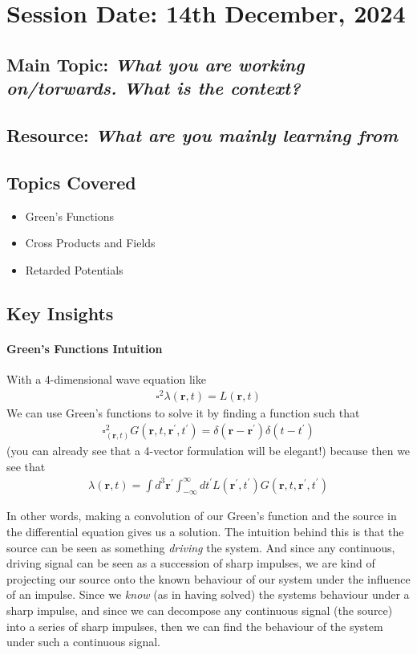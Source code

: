 \section{Session Date: 14th December, 2024}
\subsection*{Main Topic: \textit{What you are working on/torwards. What is the context?}}
\subsection*{Resource: \textit{What are you mainly learning from}}
\subsection*{Topics Covered}
\begin{itemize}
    \item Green's Functions
    \item Cross Products and Fields
    \item Retarded Potentials
\end{itemize}

\subsection*{Key Insights}
\paragraph{Green's Functions Intuition}
With a 4-dimensional wave equation like
\begin{align*}
    \square ^{2} \lambda(\mathbf{r}, t) = L(\mathbf{r}, t)
\end{align*}
We can use Green's functions to solve it by finding a function such that
\begin{align*}
    \square_{(\mathbf{r}, t)}^{2} G(\mathbf{r}, t, \mathbf{r}^{\prime}, t^{\prime} ) = \delta (\mathbf{r} - \mathbf{r}^{\prime} )\delta (t - t^{\prime} )
\end{align*}
(you can already see that a 4-vector formulation will be elegant!) because then we see that \begin{align*}
    \lambda (\mathbf{r}, t) = \int d^3 \mathbf{r}^{\prime}  \int_{-\infty}^{\infty} dt^{\prime} L(\mathbf{r}^{\prime} , t^{\prime} ) G(\mathbf{r}, t, \mathbf{r}^{\prime}, t^{\prime} )  
\end{align*}

In other words, making a convolution of our Green's function and the source in the differential equation gives us a solution. The intuition behind this is that the source can be seen as something \textit{driving} the system. And since any continuous, driving signal can be seen as a succession of sharp impulses, we are kind of projecting our source onto the known behaviour of our system under the influence of an impulse. Since we \textit{know} (as in having solved) the systems behaviour under a sharp impulse, and since we can decompose any continuous signal (the source) into a series of sharp impulses, then we can find the behaviour of the system under such a continuous signal. 

